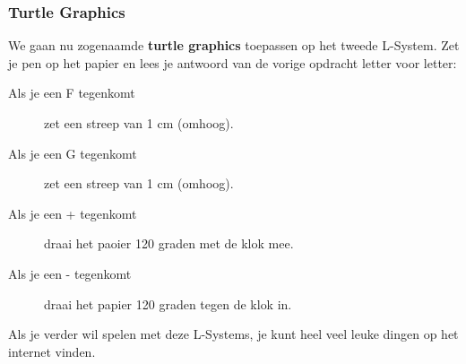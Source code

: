 \documentclass{../qh_exercise}
\begin{document}
\subsubsection{Turtle Graphics}
We gaan nu zogenaamde \textbf{turtle graphics} toepassen op het tweede L-System. Zet je pen op het papier en lees je antwoord van de vorige opdracht letter voor letter:
\begin{description}
    \item[Als je een F tegenkomt] zet een streep van 1 cm (omhoog).
    \item[Als je een G tegenkomt] zet een streep van 1 cm (omhoog).
    \item[Als je een + tegenkomt] draai het paoier 120 graden met de klok mee.
    \item[Als je een - tegenkomt] draai het papier 120 graden tegen de klok in.
\end{description}
Als je verder wil spelen met deze L-Systems, je kunt heel veel leuke dingen op het internet vinden. 
\end{document}
